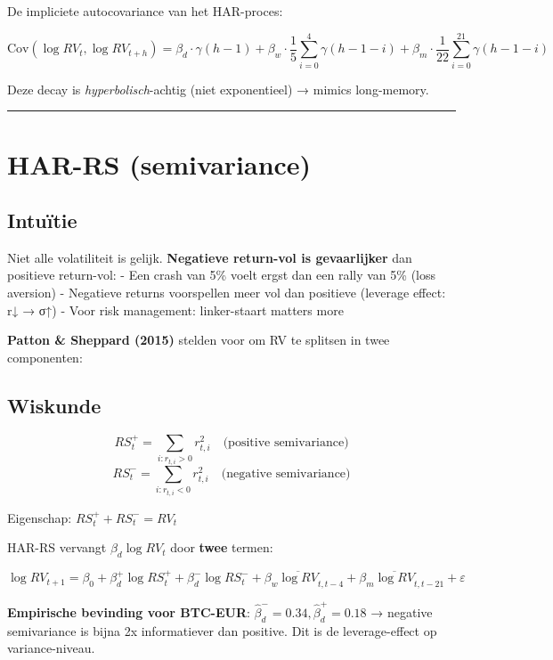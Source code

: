 \documentclass[11pt,a4paper]{article}
\begin{document}
De impliciete autocovariance van het HAR-proces:

\[\text{Cov}(\log RV_t, \log RV_{t+h}) = \beta_d \cdot \gamma(h-1) + \beta_w \cdot \frac{1}{5}\sum_{i=0}^{4}\gamma(h-1-i) + \beta_m \cdot \frac{1}{22}\sum_{i=0}^{21}\gamma(h-1-i)\]

Deze decay is \emph{hyperbolisch}-achtig (niet exponentieel) → mimics long-memory.

\begin{center}\rule{0.5\linewidth}{0.5pt}\end{center}

\hypertarget{har-rs-semivariance}{%
\section{HAR-RS (semivariance)}\label{har-rs-semivariance}}

\hypertarget{intuuxeftie-2}{%
\subsection{Intuïtie}\label{intuuxeftie-2}}

Niet alle volatiliteit is gelijk. \textbf{Negatieve return-vol is gevaarlijker} dan positieve return-vol:
- Een crash van 5\% voelt ergst dan een rally van 5\% (loss aversion)
- Negatieve returns voorspellen meer vol dan positieve (leverage effect: r↓ → σ↑)
- Voor risk management: linker-staart matters more

\textbf{Patton \& Sheppard (2015)} stelden voor om RV te splitsen in twee componenten:

\hypertarget{wiskunde}{%
\subsection{Wiskunde}\label{wiskunde}}

\[RS^+_t = \sum_{i: r_{t,i} > 0} r_{t,i}^2 \quad\text{(positive semivariance)}\]
\[RS^-_t = \sum_{i: r_{t,i} < 0} r_{t,i}^2 \quad\text{(negative semivariance)}\]

Eigenschap: \(RS^+_t + RS^-_t = RV_t\)

HAR-RS vervangt \(\beta_d \log RV_t\) door \textbf{twee} termen:

\[\log RV_{t+1} = \beta_0 + \beta_d^+ \log RS^+_t + \beta_d^- \log RS^-_t + \beta_w \overline{\log RV}_{t,t-4} + \beta_m \overline{\log RV}_{t,t-21} + \varepsilon\]

\textbf{Empirische bevinding voor BTC-EUR}: \(\hat\beta_d^- = 0.34, \hat\beta_d^+ = 0.18\) → negative semivariance is bijna 2x informatiever dan positive. Dit is de leverage-effect op variance-niveau.
\end{document}
